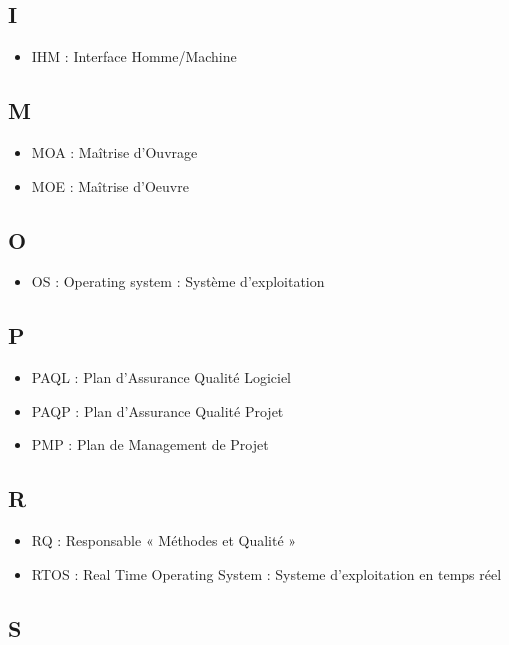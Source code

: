 \documentclass[a4paper]{article}
\begin{document}
\subsection{I}

\begin{itemize}
\item IHM : Interface Homme/Machine
\end{itemize}

\subsection{M}

\begin{itemize}
\item MOA : Maîtrise d’Ouvrage
\item MOE : Maîtrise d’Oeuvre
\end{itemize}

\subsection{O}
\begin{itemize}
\item OS : Operating system : Système d'exploitation
\end{itemize}

\subsection{P}

\begin{itemize}
\item PAQL : Plan d’Assurance Qualité Logiciel
\item PAQP : Plan d’Assurance Qualité Projet
\item PMP : Plan de Management de Projet
\end{itemize}

\subsection{R}

\begin{itemize}
\item RQ : Responsable « Méthodes et Qualité »
\item RTOS : Real Time Operating System : Systeme d'exploitation en temps réel
\end{itemize}

\subsection{S}
\end{document}
